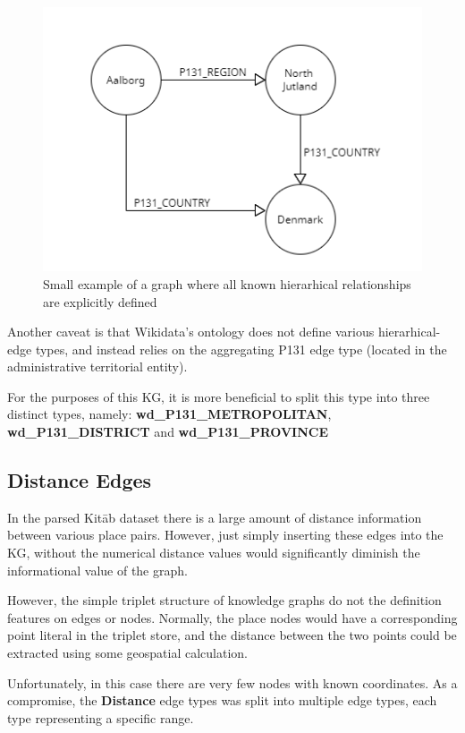 \begin{figure}[h] %
    \centering %
    \includegraphics[width=0.7\linewidth]{figures/kg-dense} %
    \caption{Small example of a graph where all known hierarhical relationships are explicitly defined} %
    \label{fig:kg-dense} %
\end{figure}

Another caveat is that Wikidata's ontology does not define various hierarhical-edge types, and instead relies on
the aggregating P131 edge type (located in the administrative territorial entity).

For the purposes of this KG, it is more beneficial to split this type into three distinct types, namely:
\textbf{wd\_P131\_METROPOLITAN}, \textbf{wd\_P131\_DISTRICT} and \textbf{wd\_P131\_PROVINCE}


\subsection{Distance Edges}
In the parsed Kitāb dataset there is a large amount of distance information between various place pairs.
However, just simply inserting these edges into the KG,
without the numerical distance values would significantly diminish the informational value of the graph.

However, the simple triplet structure of knowledge graphs do not the definition features on edges or nodes.
Normally, the place nodes would have a corresponding point literal in the triplet store, and the distance
between the two points could be extracted using some geospatial calculation.

Unfortunately, in this case there are very few nodes with known coordinates.
As a compromise, the \textbf{Distance} edge types was split into multiple edge types, each
type representing a specific range.

